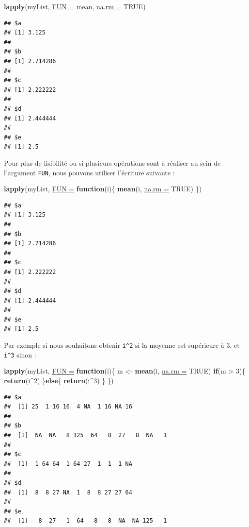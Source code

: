 \documentclass[twoside,symmetric]{book}
\newenvironment{Shaded}{}{}
\newcommand{\ControlFlowTok}[1]{\textbf{#1}}
\newcommand{\DataTypeTok}[1]{\underline{#1}}
\newcommand{\DecValTok}[1]{#1}
\newcommand{\KeywordTok}[1]{\textbf{#1}}
\newcommand{\NormalTok}[1]{#1}
\newcommand{\OperatorTok}[1]{#1}
\newcommand{\OtherTok}[1]{#1}
\newcommand{\StringTok}[1]{#1}
\begin{document}
\begin{Shaded}
\begin{Highlighting}[]
\KeywordTok{lapply}\NormalTok{(myList, }\DataTypeTok{FUN =}\NormalTok{ mean, }\DataTypeTok{na.rm =} \OtherTok{TRUE}\NormalTok{)}
\end{Highlighting}
\end{Shaded}

\begin{verbatim}
## $a
## [1] 3.125
## 
## $b
## [1] 2.714286
## 
## $c
## [1] 2.222222
## 
## $d
## [1] 2.444444
## 
## $e
## [1] 2.5
\end{verbatim}

Pour plus de lisibilité ou si plusieurs opérations sont à réaliser au sein de l'argument \texttt{FUN}, nous pouvons utiliser l'écriture suivante :

\begin{Shaded}
\begin{Highlighting}[]
\KeywordTok{lapply}\NormalTok{(myList, }\DataTypeTok{FUN =} \ControlFlowTok{function}\NormalTok{(i)\{}
  \KeywordTok{mean}\NormalTok{(i, }\DataTypeTok{na.rm =} \OtherTok{TRUE}\NormalTok{)}
\NormalTok{\})}
\end{Highlighting}
\end{Shaded}

\begin{verbatim}
## $a
## [1] 3.125
## 
## $b
## [1] 2.714286
## 
## $c
## [1] 2.222222
## 
## $d
## [1] 2.444444
## 
## $e
## [1] 2.5
\end{verbatim}

Par exemple si nous souhaitons obtenir \texttt{i\^{}2} si la moyenne est supérieure à 3, et \texttt{i\^{}3} sinon :

\begin{Shaded}
\begin{Highlighting}[]
\KeywordTok{lapply}\NormalTok{(myList, }\DataTypeTok{FUN =} \ControlFlowTok{function}\NormalTok{(i)\{}
\NormalTok{  m <-}\StringTok{ }\KeywordTok{mean}\NormalTok{(i, }\DataTypeTok{na.rm =} \OtherTok{TRUE}\NormalTok{)}
  \ControlFlowTok{if}\NormalTok{(m }\OperatorTok{>}\StringTok{ }\DecValTok{3}\NormalTok{)\{}
    \KeywordTok{return}\NormalTok{(i}\OperatorTok{^}\DecValTok{2}\NormalTok{)  }
\NormalTok{  \}}\ControlFlowTok{else}\NormalTok{\{}
    \KeywordTok{return}\NormalTok{(i}\OperatorTok{^}\DecValTok{3}\NormalTok{)}
\NormalTok{  \}}
\NormalTok{\})}
\end{Highlighting}
\end{Shaded}

\begin{verbatim}
## $a
##  [1] 25  1 16 16  4 NA  1 16 NA 16
## 
## $b
##  [1]  NA  NA   8 125  64   8  27   8  NA   1
## 
## $c
##  [1]  1 64 64  1 64 27  1  1  1 NA
## 
## $d
##  [1]  8  8 27 NA  1  8  8 27 27 64
## 
## $e
##  [1]   8  27   1  64   8   8  NA  NA 125   1
\end{verbatim}
\end{document}
